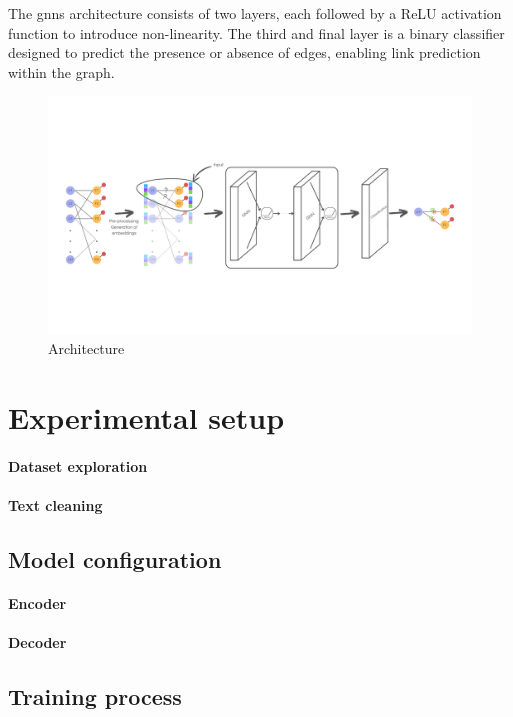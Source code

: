 \documentclass[11pt]{article}
\begin{document}
The \acp{gnn} architecture consists of two layers, each followed by a ReLU activation 
function to introduce non-linearity. The third and final layer is a binary classifier 
designed to predict the presence or absence of edges, enabling link prediction within the 
graph.



\begin{figure}
  \centering
  \includegraphics[width=1\linewidth]{figures/architecture.pdf}

  \caption{
    Architecture
  }
  \label{fig:architecture}
\end{figure}

\section{Experimental setup}\label{sec:experimental-setup}

\paragraph{Dataset exploration}

\paragraph{Text cleaning}

\subsection{Model configuration}\label{sec:model-config}

\paragraph{Encoder}


\paragraph{Decoder}



\subsection{Training process}\label{sec:training-process}






\end{document}
